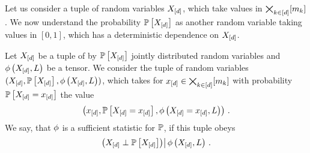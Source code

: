 

Let us consider a tuple of random variables $X_{[d]}$, which take values in $\bigtimes_{k\in[d]}[m_{k}]$.
We now understand the probability $\mathbb{P}\left[X_{[d]}\right]$ as another random variable taking values in $[0,1]$, which has a deterministic dependence on $X_{[d]}$.

\begin{definition}
    Let $X_{[d]}$ be a tuple of by $\mathbb{P}\left[X_{[d]}\right]$ jointly distributed random variables and $\phi\left(X_{[d]},L\right)$ be a tensor.
    We consider the tuple of random variables $(X_{[d]},\mathbb{P}\left[X_{[d]}\right],\phi\left(X_{[d]},L\right))$, which takes for $x_{[d]}\in\bigtimes_{k\in[d]}[m_{k}]$ with probability $\mathbb{P}\left[X_{[d]}=x_{[d]}\right]$ the value
    \begin{align*}
        \left(x_{[d]},\mathbb{P}\left[X_{[d]}=x_{[d]}\right],\phi\left(X_{[d]}=x_{[d]},L\right)\right) \, .
    \end{align*}
    We say, that $\phi$ is a sufficient statistic for $\mathbb{P}$, if this tuple obeys
    \begin{align*}
        \left(X_{[d]}\perp\mathbb{P}\left[X_{[d]}\right]\middle)\right| \phi\left(X_{[d]},L\right) \, .
    \end{align*}
\end{definition}




